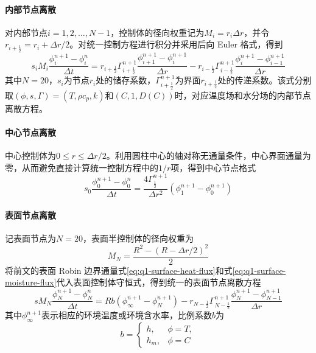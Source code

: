 \documentclass[withoutpreface,bwprint]{cumcmthesis}
\begin{document}
\paragraph{内部节点离散}
对内部节点$i=1,2,\ldots,N-1$，控制体的径向权重记为$M_i=r_i\Delta r$，并令$r_{i+\frac12}=r_i+\Delta r/2$。对统一控制方程进行积分并采用后向 Euler 格式，得到
\begin{equation}
s_iM_i\frac{\phi_i^{n+1}-\phi_i^n}{\Delta t}
=
r_{i+\frac12}\Gamma_{i+\frac12}^{n+1}
\frac{\phi_{i+1}^{n+1}-\phi_i^{n+1}}{\Delta r}
-r_{i-\frac12}\Gamma_{i-\frac12}^{n+1}
\frac{\phi_i^{n+1}-\phi_{i-1}^{n+1}}{\Delta r}
\label{eq:q1-fvm-interior}
\end{equation}
其中$N=20$，$s_i$为节点$r_i$处的储存系数，$\Gamma_{i+\frac12}^{n+1}$为界面$r_{i+\frac12}$处的传递系数。该式分别取$(\phi,s,\Gamma)=(T,\rho c_p,k)$和$(C,1,D(C))$时，对应温度场和水分场的内部节点离散方程。

\paragraph{中心节点离散}
中心控制体为$0\le r\le\Delta r/2$。利用圆柱中心的轴对称无通量条件，中心界面通量为零，从而避免直接计算统一控制方程中的$1/r$项，得到中心节点格式
\begin{equation}
s_0\frac{\phi_0^{n+1}-\phi_0^n}{\Delta t}
=\frac{4\Gamma_{\frac12}^{n+1}}{\Delta r^2}
\left(\phi_1^{n+1}-\phi_0^{n+1}\right)
\label{eq:q1-fvm-center}
\end{equation}

\paragraph{表面节点离散}
记表面节点为$N=20$，表面半控制体的径向权重为
\begin{equation}
M_N=\frac{R^2-(R-\Delta r/2)^2}{2}
\label{eq:q1-surface-weight}
\end{equation}
将前文的表面 Robin 边界通量式\eqref{eq:q1-surface-heat-flux}和式\eqref{eq:q1-surface-moisture-flux}代入表面控制体守恒式，得到统一的表面节点离散方程
\begin{equation}
sM_N\frac{\phi_N^{n+1}-\phi_N^n}{\Delta t}
=Rb\left(\phi_\infty^{n+1}-\phi_N^{n+1}\right)
-r_{N-\frac12}\Gamma_{N-\frac12}^{n+1}
\frac{\phi_N^{n+1}-\phi_{N-1}^{n+1}}{\Delta r}
\label{eq:q1-fvm-surface}
\end{equation}
其中$\phi_\infty^{n+1}$表示相应的环境温度或环境含水率，比例系数$b$为
\begin{equation}
b=
\begin{cases}
h,&\phi=T,\\
h_m,&\phi=C
\end{cases}
\label{eq:q1-surface-transfer-coefficient}
\end{equation}
\end{document}
